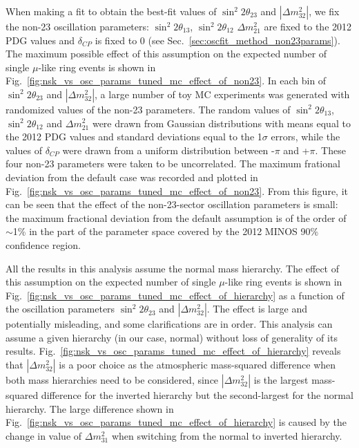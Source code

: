 When making a fit to obtain the best-fit values of $\sin^{2}2\theta_{23}$ and $|\Delta m^{2}_{32}|$, we fix the 
non-23 oscillation parameters: $\sin^{2}2\theta_{13}$, $\sin^{2}2\theta_{12}$ $\Delta m^{2}_{21}$ are fixed 
to the 2012 PDG values and $\delta_{CP}$ is fixed to 0 (see Sec.\ \ref{sec:oscfit_method_non23params}). The 
maximum possible effect of this assumption on the expected number of single $\mu$-like ring events is shown 
in Fig.\ \ref{fig:nsk_vs_osc_params_tuned_mc_effect_of_non23}.
In each bin of $\sin^{2}{2\theta_{23}}$ and $|\Delta m^{2}_{32}|$,
a large number of toy MC experiments was generated with randomized values of the non-23 parameters. 
The random values of $\sin^{2}2\theta_{13}$, $\sin^{2}2\theta_{12}$ and $\Delta m^{2}_{21}$ were drawn from 
Gaussian distributions with means equal to the 2012 PDG values and standard deviations equal to the 1$\sigma$ 
errors, while the values of $\delta_{CP}$ were drawn from a uniform distribution between -$\pi$ and +$\pi$.
These four non-23 parameters were taken to be uncorrelated.
The maximum frational deviation from the default case was recorded and plotted 
in Fig.\ \ref{fig:nsk_vs_osc_params_tuned_mc_effect_of_non23}.
From this figure, it can be seen that the effect of the non-23-sector oscillation parameters is small:
the maximum fractional deviation from the default assumption is of the order of $\sim$1\% in the part of 
the parameter space covered by the 2012 MINOS 90\% confidence region. 

All the results in this analysis assume the normal mass hierarchy. 
The effect of this assumption on the expected number of single $\mu$-like ring events
is shown in Fig.\ \ref{fig:nsk_vs_osc_params_tuned_mc_effect_of_hierarchy} 
as a function of the oscillation parameters $\sin^{2}{2\theta_{23}}$ and $|\Delta m^{2}_{32}|$.
The effect is large and potentially misleading, and some clarifications are in order.
This analysis can assume a given hierarchy (in our case, normal) without loss of generality of its results.
Fig.\ \ref{fig:nsk_vs_osc_params_tuned_mc_effect_of_hierarchy} reveals that $|\Delta m^{2}_{32}|$ is a poor 
choice as the atmospheric mass-squared difference when both mass hierarchies need to be considered,
since $|\Delta m^{2}_{32}|$ is the largest mass-squared difference for the inverted hierarchy 
but the second-largest for the normal hierarchy. 
The large difference shown in Fig.\ \ref{fig:nsk_vs_osc_params_tuned_mc_effect_of_hierarchy} 
is caused by the change in value of $\Delta m^{2}_{31}$ when switching from the
normal to inverted hierarchy.

